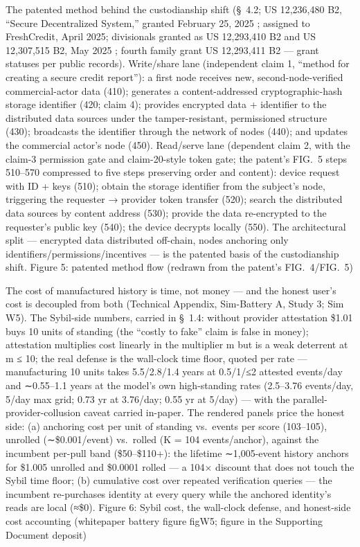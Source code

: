 \documentclass[
]{article}
\begin{document}
The patented method behind the custodianship shift (§~4.2; US 12,236,480
B2, ``Secure Decentralized System,'' granted February 25, 2025 {};
assigned to FreshCredit, April 2025; divisionals granted as US
12,293,410 B2 and US 12,307,515 B2, May 2025 {}; fourth family grant US
12,293,411 B2 {} --- grant statuses per public records). Write/share
lane (independent claim 1, ``method for creating a secure credit
report''): a first node receives new, second-node-verified
commercial-actor data (410); generates a content-addressed
cryptographic-hash storage identifier (420; claim 4); provides encrypted
data + identifier to the distributed data sources under the
tamper-resistant, permissioned structure (430); broadcasts the
identifier through the network of nodes (440); and updates the
commercial actor's node (450). Read/serve lane (dependent claim 2, with
the claim-3 permission gate and claim-20-style token gate; the patent's
FIG.~5 steps 510--570 compressed to five steps preserving order and
content): device request with ID + keys (510); obtain the storage
identifier from the subject's node, triggering the requester {→}
provider token transfer (520); search the distributed data sources by
content address (530); provide the data re-encrypted to the requester's
public key (540); the device decrypts locally (550). The architectural
split --- encrypted data distributed off-chain, nodes anchoring only
identifiers/permissions/incentives --- is the patented basis of the
custodianship shift. Figure 5: patented method flow (redrawn from the
patent's FIG.~4/FIG.~5)

The cost of manufactured history is time, not money --- and the honest
user's cost is decoupled from both (Technical Appendix, Sim-Battery A,
Study 3; Sim W5). The Sybil-side numbers, carried in §~1.4: without
provider attestation \$1.01 buys 10 units of standing (the ``costly to
fake'' claim is false in money); attestation multiplies cost linearly in
the multiplier m but is a weak deterrent at m {≤} 10; the real defense
is the wall-clock time floor, quoted per rate --- manufacturing 10 units
takes 5.5/2.8/1.4 years at 0.5/1/{≤}2 attested events/day and
{∼}0.55--1.1 years at the model's own high-standing rates (2.5--3.76
events/day, 5/day max grid; 0.73 yr at 3.76/day; 0.55 yr at 5/day) ---
with the parallel-provider-collusion caveat carried in-paper. The
rendered panels price the honest side: (a) anchoring cost per unit of
standing vs.~events per score ({103}--{105}), unrolled
({∼}\$0.001/event) vs.~rolled ({K = 104} events/anchor), against the
incumbent per-pull band (\$50--\$110+): the lifetime {∼}1,005-event
history anchors for \$1.005 unrolled and \$0.0001 rolled --- a {104×}
discount that does not touch the Sybil time floor; (b) cumulative cost
over repeated verification queries --- the incumbent re-purchases
identity at every query while the anchored identity's reads are local
({≈}\$0). Figure 6: Sybil cost, the wall-clock defense, and honest-side
cost accounting (whitepaper battery figure figW5; figure in the
Supporting Document deposit)
\end{document}
